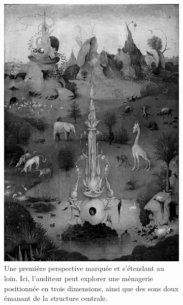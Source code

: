 \begin{subfigure}[t]{0.45\textwidth}
\centering
\begin{subfigure}[t]{\textwidth}
    \centering
    \includegraphics[width=\textwidth]{images/A1.png}
    \caption{Une première perspective marquée et s'étendant au loin. Ici, l'auditeur peut explorer une ménagerie positionnée en trois dimensions, ainsi que des sons doux émanant de la structure centrale.}
    \label{fig.a1}
\end{subfigure}~\\       
\begin{subfigure}[t]{\textwidth}
    \centering

\end{subfigure}
\end{subfigure}
